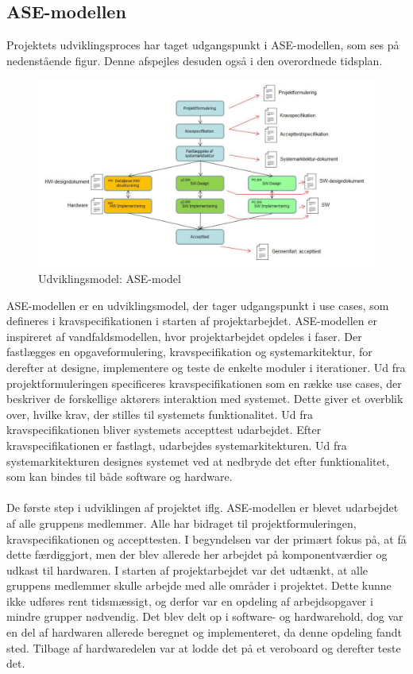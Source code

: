 \subsection{ASE-modellen}
Projektets udviklingsproces har taget udgangspunkt i ASE-modellen, som ses på nedenstående figur. Denne afspejles desuden også i den overordnede tidsplan. 
\begin{figure}[H]
	\centering
	\includegraphics[width=1\textwidth]{Figurer/asemodel}
	\caption{Udviklingsmodel: ASE-model}
\end{figure}
ASE-modellen er en udviklingsmodel, der tager udgangspunkt i use cases, som defineres i kravspecifikationen i starten af projektarbejdet. ASE-modellen er inspireret af vandfaldsmodellen, hvor projektarbejdet opdeles i faser. Der fastlægges en opgaveformulering, kravspecifikation og systemarkitektur, for derefter at designe, implementere og teste de enkelte moduler i iterationer. Ud fra projektformuleringen specificeres kravspecifikationen som en række use cases, der beskriver de forskellige aktørers interaktion med systemet. Dette giver et overblik over, hvilke krav, der stilles til systemets funktionalitet. Ud fra kravspecifikationen bliver systemets accepttest udarbejdet. Efter kravspecifikationen er fastlagt, udarbejdes systemarkitekturen. Ud fra systemarkitekturen designes systemet ved at nedbryde det efter funktionalitet, som kan bindes til både software og hardware. \\\\
De første step i udviklingen af projektet iflg. ASE-modellen er blevet udarbejdet af alle gruppens medlemmer. Alle har bidraget til projektformuleringen, kravspecifikationen og accepttesten. I begyndelsen var der primært fokus på, at få dette færdiggjort, men der blev allerede her arbejdet på komponentværdier og udkast til hardwaren. I starten af projektarbejdet var det udtænkt, at alle gruppens medlemmer skulle arbejde med alle områder i projektet. Dette kunne ikke udføres rent tidsmæssigt, og derfor var en opdeling af arbejdsopgaver i mindre grupper nødvendig. Det blev delt op i software- og hardwarehold, dog var en del af hardwaren allerede beregnet og implementeret, da denne opdeling fandt sted. Tilbage af hardwaredelen var at lodde det på et veroboard og derefter teste det.\\\\

